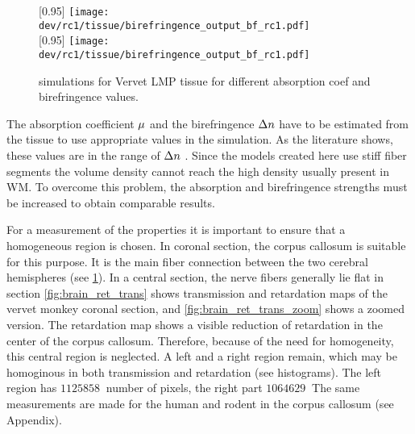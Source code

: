 % 
% 
% 
\begin{figure}[!t]
\centering
[0.95\textwidth]{
\texttt{[image: dev/rc1/tissue/birefringence\_output\_bf\_rc1.pdf]}}\\[1em]
[0.95\textwidth]{
\texttt{[image: dev/rc1/tissue/birefringence\_output\_bf\_rc1.pdf]}}
\caption{simulations for Vervet LMP tissue for different absorption coef and birefringence values. }
\label{fig:parameterModelSim}
\end{figure}
% 
The absorption coefficient $\textnormal{$\mu$}{}$ and the birefringence $\textnormal{$\Delta n$}{}$ have to be estimated from the tissue to use appropriate values in the simulation.
As the literature shows, these values are in the range of $\textnormal{$\Delta n$}{}$ \dummy{}.
Since the models created here use stiff fiber segments the volume density cannot reach the high density usually present in \ac{WM}.
To overcome this problem, the absorption and birefringence strengths must be increased to obtain comparable results.
\par
%
For a measurement of the properties it is important to ensure that a homogeneous region is chosen.
In coronal section, the corpus callosum is suitable for this purpose. It is the main fiber connection between the two cerebral hemispheres (see \cref{fig:parameterModelSim}). In a central section, the nerve fibers generally lie flat in section
% 
\ref{fig:brain_ret_trans} shows transmission and retardation maps of the vervet monkey coronal section, and \ref{fig:brain_ret_trans_zoom} shows a zoomed version.
The retardation map shows a visible reduction of retardation in the center of the corpus callosum.
Therefore, because of the need for homogeneity, this central region is neglected.
A left and a right region remain, which may be homoginous in both transmission and retardation (see histograms).
The left region has $\SI{1125858}{}$ number of pixels, the right part $\SI{1064629}{}$
% 
The same measurements are made for the human and rodent in the corpus callosum (see Appendix). 
% 
% 
% 
